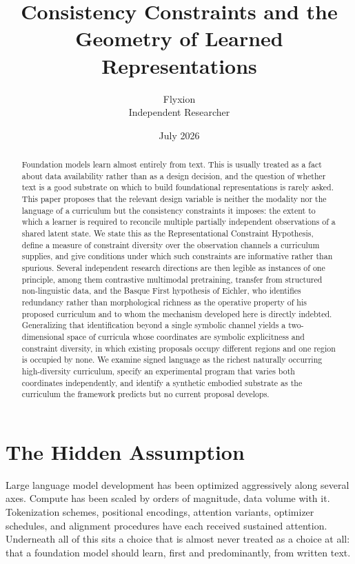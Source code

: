 \documentclass[11pt]{article}
\title{Consistency Constraints and the Geometry of Learned Representations}
\author{Flyxion\\Independent Researcher}
\date{July 2026}
\begin{document}
\maketitle

\begin{abstract}
Foundation models learn almost entirely from text. This is usually treated as a fact about data availability rather than as a design decision, and the question of whether text is a good substrate on which to build foundational representations is rarely asked. This paper proposes that the relevant design variable is neither the modality nor the language of a curriculum but the consistency constraints it imposes: the extent to which a learner is required to reconcile multiple partially independent observations of a shared latent state. We state this as the Representational Constraint Hypothesis, define a measure of constraint diversity over the observation channels a curriculum supplies, and give conditions under which such constraints are informative rather than spurious. Several independent research directions are then legible as instances of one principle, among them contrastive multimodal pretraining, transfer from structured non-linguistic data, and the Basque First hypothesis of Eichler, who identifies redundancy rather than morphological richness as the operative property of his proposed curriculum and to whom the mechanism developed here is directly indebted. Generalizing that identification beyond a single symbolic channel yields a two-dimensional space of curricula whose coordinates are symbolic explicitness and constraint diversity, in which existing proposals occupy different regions and one region is occupied by none. We examine signed language as the richest naturally occurring high-diversity curriculum, specify an experimental program that varies both coordinates independently, and identify a synthetic embodied substrate as the curriculum the framework predicts but no current proposal develops.
\end{abstract}



\section{The Hidden Assumption}
\label{sec:assumption}

Large language model development has been optimized aggressively along several axes. Compute has been scaled by orders of magnitude, data volume with it. Tokenization schemes, positional encodings, attention variants, optimizer schedules, and alignment procedures have each received sustained attention. Underneath all of this sits a choice that is almost never treated as a choice at all: that a foundation model should learn, first and predominantly, from written text.
\end{document}
